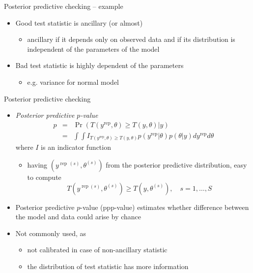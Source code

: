\documentclass[t]{beamer}
\DeclareMathOperator{\rep}{\mathrm{rep}}
\begin{document}
\begin{frame}{Posterior predictive checking -- example}

  \begin{itemize}
  \item<1-> Good test statistic is ancillary (or almost)
    \begin{itemize}
    \item ancillary if it depends only on observed data and if its
      distribution is independent of the parameters of the model
    \end{itemize}
  \item<2-> Bad test statistic is highly dependent of the parameters
    \begin{itemize}
    \item e.g. variance for normal model
    \end{itemize}
  \end{itemize}
  \vspace{-1.5\baselineskip}

\end{frame}

\begin{frame}{Posterior predictive checking}

  \begin{itemize}
  \item<1-> \textit{Posterior predictive $p$-value}
    \begin{eqnarray*}
      p & = & \Pr(T(y^{\rep},\theta)\geq T(y,\theta)|y)\\
      & = & \int\int
      I_{T(y^{\rep},\theta)\geq T(y,\theta)}p(y^{\rep}|\theta)p(\theta|y)dy^{\rep}d\theta
    \end{eqnarray*}
    where $I$ is an indicator function
    \begin{itemize}
    \item<1->  having $(y^{\rep\,(s)},\theta^{(s)})$ from the posterior predictive
      distribution, easy to compute
      \begin{equation*}
        T(y^{\rep (s)},\theta^{(s)})\geq T(y,\theta^{(s)}), \quad s=1,\ldots,S
      \end{equation*}
    \end{itemize}
    \vspace{-1.5\baselineskip}
  \item<1-> Posterior predictive $p$-value (ppp-value) estimates whether
    difference between the model and data could arise by chance
  \item<1-> \color{black} Not commonly used, as
    \begin{itemize}
    \item not calibrated in case of non-ancillary statistic
    \item the distribution of test statistic has more information
    \end{itemize}
  \end{itemize}

\end{frame}
\end{document}
